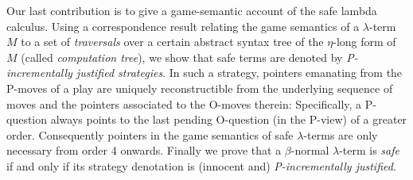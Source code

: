 Our last contribution is to give a game-semantic account of the safe
lambda calculus.
%
Using a correspondence result relating the game semantics of a
$\lambda$-term $M$ to a set of \emph{traversals} \cite{OngLics2006}
over a certain abstract syntax tree of the $\eta$-long form of $M$
(called \emph{computation tree}), we show that safe terms are denoted
by \emph{P-incrementally justified strategies}. In such a strategy,
pointers emanating from the P-moves of a play are uniquely
reconstructible from the underlying sequence of moves and the pointers
associated to the O-moves therein: Specifically, a P-question always
points to the last pending O-question (in the P-view) of a greater
order. Consequently pointers in the game semantics of safe
$\lambda$-terms are only necessary from order 4 onwards. Finally we
prove that a $\beta$-normal $\lambda$-term is \emph{safe}
if and only if its strategy denotation is (innocent and)
\emph{P-incrementally justified}.



